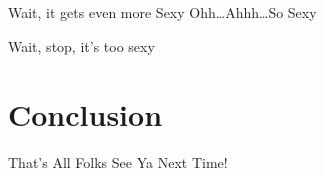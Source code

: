 \documentclass{beamer}
\begin{document}
\begin{frame}{Wait, it gets even more Sexy}
  Ohh\ldots Ahhh\ldots So Sexy

  Wait, stop, it's too sexy
\end{frame}

\section{Conclusion}
\begin{frame}[standout]{That's All Folks}
  See Ya Next Time!
\end{frame}
\end{document}
